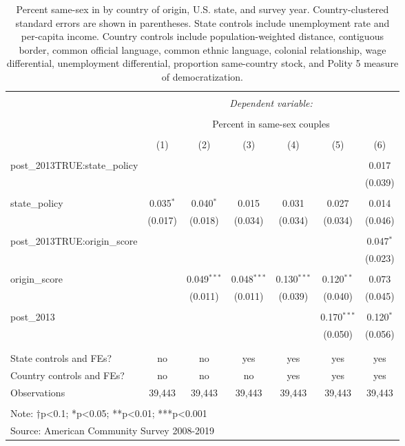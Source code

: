 \documentclass[
  11pt,
]{article}
\begin{document}
\begin{table}[!htbp] \centering 
  \caption{Percent same-sex in by country of origin, U.S. state, and survey year. Country-clustered standard errors are shown in parentheses. State controls include unemployment rate and per-capita income. Country controls include population-weighted distance, contiguous border, common official language, common ethnic language, colonial relationship, wage differential, unemployment differential, proportion same-country stock, and Polity 5 measure of democratization.} 
  \label{tab:state-props} 
\begin{tabular}{@{\extracolsep{5pt}}lcccccc} 
\\[-1.8ex]\hline 
\hline \\[-1.8ex] 
 & \multicolumn{6}{c}{\textit{Dependent variable:}} \\ 
\cline{2-7} 
\\[-1.8ex] & \multicolumn{6}{c}{Percent in same-sex couples} \\ 
\\[-1.8ex] & (1) & (2) & (3) & (4) & (5) & (6)\\ 
\hline \\[-1.8ex] 
 post\_2013TRUE:state\_policy &  &  &  &  &  & 0.017 \\ 
  &  &  &  &  &  & (0.039) \\ 
  & & & & & & \\ 
 state\_policy & 0.035$^{*}$ & 0.040$^{*}$ & 0.015 & 0.031 & 0.027 & 0.014 \\ 
  & (0.017) & (0.018) & (0.034) & (0.034) & (0.034) & (0.046) \\ 
  & & & & & & \\ 
 post\_2013TRUE:origin\_score &  &  &  &  &  & 0.047$^{*}$ \\ 
  &  &  &  &  &  & (0.023) \\ 
  & & & & & & \\ 
 origin\_score &  & 0.049$^{***}$ & 0.048$^{***}$ & 0.130$^{***}$ & 0.120$^{**}$ & 0.073 \\ 
  &  & (0.011) & (0.011) & (0.039) & (0.040) & (0.045) \\ 
  & & & & & & \\ 
 post\_2013 &  &  &  &  & 0.170$^{***}$ & 0.120$^{*}$ \\ 
  &  &  &  &  & (0.050) & (0.056) \\ 
  & & & & & & \\ 
\hline \\[-1.8ex] 
State controls and FEs? & no & no & yes & yes & yes & yes \\ 
Country controls and FEs? & no & no & no & yes & yes & yes \\ 
Observations & 39,443 & 39,443 & 39,443 & 39,443 & 39,443 & 39,443 \\ 
\hline 
\hline \\[-1.8ex] 
\multicolumn{7}{l}{Note: †p<0.1; *p<0.05; **p<0.01; ***p<0.001} \\ 
\multicolumn{7}{l}{Source: American Community Survey 2008-2019} \\ 
\end{tabular} 
\end{table}
\end{document}
